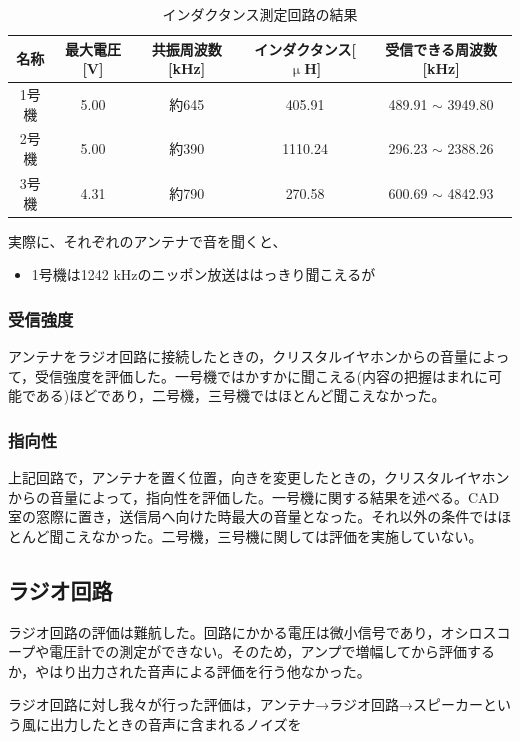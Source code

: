 \documentclass[report.tex]{subfiles}
\begin{document}
\begin{table}[h]
	\centering
	\caption{インダクタンス測定回路の結果}
	\label{tab:ant2}
	\begin{tabular}{ccccc} \hline
		名称  & 最大電圧[V] & 共振周波数[kHz] & インダクタンス[\(\upmu\)H] & 受信できる周波数[kHz]           \\ \hline
		1号機 & 5.00    & 約645       & 405.91              & 489.91 \(\sim\) 3949.80 \\
		2号機 & 5.00    & 約390       & 1110.24             & 296.23 \(\sim\) 2388.26 \\
		3号機 & 4.31    & 約790       & 270.58              & 600.69 \(\sim\) 4842.93 \\ \hline
	\end{tabular}
\end{table}

実際に、それぞれのアンテナで音を聞くと、

\begin{itemize}
	\item 1号機は1242 kHzのニッポン放送ははっきり聞こえるが
\end{itemize}



\subsubsection{受信強度}
アンテナをラジオ回路に接続したときの，クリスタルイヤホンからの音量によって，受信強度を評価した。一号機ではかすかに聞こえる(内容の把握はまれに可能である)ほどであり，二号機，三号機ではほとんど聞こえなかった。
\subsubsection{指向性}
上記回路で，アンテナを置く位置，向きを変更したときの，クリスタルイヤホンからの音量によって，指向性を評価した。一号機に関する結果を述べる。CAD室の窓際に置き，送信局へ向けた時最大の音量となった。それ以外の条件ではほとんど聞こえなかった。二号機，三号機に関しては評価を実施していない。

\subsection{ラジオ回路}
ラジオ回路の評価は難航した。回路にかかる電圧は微小信号であり，オシロスコープや電圧計での測定ができない。そのため，アンプで増幅してから評価するか，やはり出力された音声による評価を行う他なかった。

ラジオ回路に対し我々が行った評価は，アンテナ→ラジオ回路→スピーカーという風に出力したときの音声に含まれるノイズを
\end{document}
